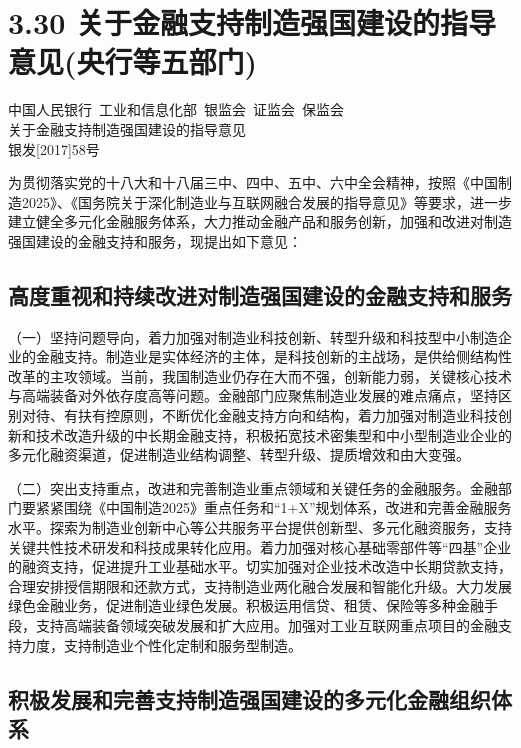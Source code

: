 \chapter{3.30 关于金融支持制造强国建设的指导意见(央行等五部门)} %

\begin{center}
中国人民银行~工业和信息化部~银监会~证监会~保监会 \\
关于金融支持制造强国建设的指导意见 \\
银发[2017]58号
\end{center}

为贯彻落实党的十八大和十八届三中、四中、五中、六中全会精神，按照《中国制造2025》、《国务院关于深化制造业与互联网融合发展的指导意见》等要求，进一步建立健全多元化金融服务体系，大力推动金融产品和服务创新，加强和改进对制造强国建设的金融支持和服务，现提出如下意见：

\section{高度重视和持续改进对制造强国建设的金融支持和服务}

（一）坚持问题导向，着力加强对制造业科技创新、转型升级和科技型中小制造企业的金融支持。制造业是实体经济的主体，是科技创新的主战场，是供给侧结构性改革的主攻领域。当前，我国制造业仍存在大而不强，创新能力弱，关键核心技术与高端装备对外依存度高等问题。金融部门应聚焦制造业发展的难点痛点，坚持区别对待、有扶有控原则，不断优化金融支持方向和结构，着力加强对制造业科技创新和技术改造升级的中长期金融支持，积极拓宽技术密集型和中小型制造业企业的多元化融资渠道，促进制造业结构调整、转型升级、提质增效和由大变强。

（二）突出支持重点，改进和完善制造业重点领域和关键任务的金融服务。金融部门要紧紧围绕《中国制造2025》重点任务和“1+X”规划体系，改进和完善金融服务水平。探索为制造业创新中心等公共服务平台提供创新型、多元化融资服务，支持关键共性技术研发和科技成果转化应用。着力加强对核心基础零部件等“四基”企业的融资支持，促进提升工业基础水平。切实加强对企业技术改造中长期贷款支持，合理安排授信期限和还款方式，支持制造业两化融合发展和智能化升级。大力发展绿色金融业务，促进制造业绿色发展。积极运用信贷、租赁、保险等多种金融手段，支持高端装备领域突破发展和扩大应用。加强对工业互联网重点项目的金融支持力度，支持制造业个性化定制和服务型制造。

\section{积极发展和完善支持制造强国建设的多元化金融组织体系}

